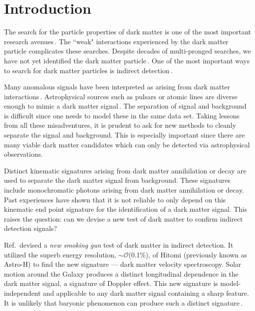 \documentclass[aps,prd,10pt,twocolumn,superscriptaddress,showpacs]{revtex4-1}
\begin{document}
\section{Introduction}
\label{sec:Introduction}

The search for the particle properties of dark matter is one of the most important research avenues\,\cite{Jungman:1995df,Bertone:2004pz,Strigari:2013iaa}.  The ``weak" interactions experienced by the dark matter particle complicates these searches.  Despite decades of multi-pronged searches, we have not yet identified the dark matter particle\,\cite{Bertone:2016nfn}.  One of the most important ways to search for dark matter particles is indirect detection\,\cite{Klasen:2015uma}.

Many anomalous signals have been interpreted as arising from dark matter interactions\,\cite{Loewenstein:2009cm,Prokhorov:2010us,Weniger:2012tx,Abazajian:2014hsa,Lee:2015fea,Bartels:2015aea,Bulbul:2014sua,Boyarsky:2014jta,Urban:2014yda}.  Astrophysical sources such as pulsars or atomic lines are diverse enough to mimic a dark matter signal\,\cite{O'Leary:2015gfa,Brandt:2015ula,O'Leary:2016osi,Gu:2015gqm,Phillips:2015wla,Shah:2016efh}.  The separation of signal and background is difficult since one needs to model these in the same data set.  Taking lessons from all these misadventures, it is prudent to ask for new methods to cleanly separate the signal and background.  This is especially important since there are many viable dark matter candidates which can only be detected via astrophysical observations.  

Distinct kinematic signatures arising from dark matter annihilation or decay are used to separate the dark matter signal from background.  These signatures include monochromatic photons arising from dark matter annihilation or decay.  Past experiences have shown that it is not reliable to only depend on this kinematic end point signature for the identification of a dark matter signal.  This raises the question: can we devise a new test of dark matter to confirm indirect detection signals?

Ref.\,\cite{speckhard2016} devised a {\it new smoking gun} test of dark matter in indirect detection.  It utilized the superb energy resolution, $\sim \mathcal{O}$(0.1\%), of Hitomi (previously known as Astro-H) to find the new signature --- dark matter velocity spectroscopy.  Solar motion around the Galaxy produces a distinct longitudinal dependence in the dark matter signal, a signature of Doppler effect.  This new signature is model-independent and applicable to any dark matter signal containing a sharp feature.  It is unlikely that baryonic phenomenon can produce such a distinct signature\,\cite{speckhard2016}.
\end{document}
